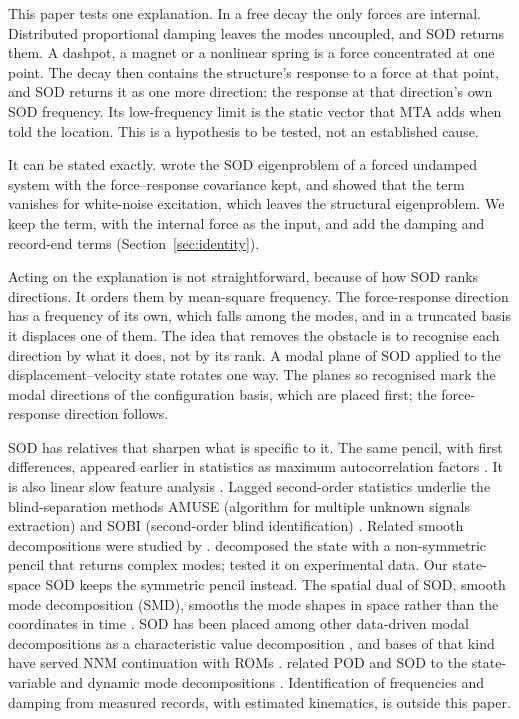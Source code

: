 \documentclass[preprint,12pt]{elsarticle}
\begin{document}
This paper tests one explanation. In a free decay the only forces are internal. Distributed proportional damping leaves the modes uncoupled, and SOD returns them. A dashpot, a magnet or a nonlinear spring is a force concentrated at one point. The decay then contains the structure's response to a force at that point, and SOD returns it as one more direction: the response at that direction's own SOD frequency. Its low-frequency limit is the static vector that MTA adds when told the location. This is a hypothesis to be tested, not an established cause.

It can be stated exactly. \citet{Farooq2008} wrote the SOD eigenproblem of a forced undamped system with the force--response covariance kept, and showed that the term vanishes for white-noise excitation, which leaves the structural eigenproblem. We keep the term, with the internal force as the input, and add the damping and record-end terms (Section~\ref{sec:identity}).

Acting on the explanation is not straightforward, because of how SOD ranks directions. It orders them by mean-square frequency. The force-response direction has a frequency of its own, which falls among the modes, and in a truncated basis it displaces one of them.
The idea that removes the obstacle is to recognise each direction by what it does, not by its rank. A modal plane of SOD applied to the displacement--velocity state rotates one way. The planes so recognised mark the modal directions of the configuration basis, which are placed first; the force-response direction follows.


SOD has relatives that sharpen what is specific to it.
The same pencil, with first differences, appeared earlier in statistics as maximum autocorrelation factors \citep{Switzer1984,Shapiro1989}. It is also linear slow feature analysis \citep{Wiskott2002}. Lagged second-order statistics underlie the blind-separation methods AMUSE (algorithm for multiple unknown signals extraction) and SOBI (second-order blind identification) \citep{Tong1991,Belouchrani1997}. Related smooth decompositions were studied by \citet{Bellizzi2009,Bellizzi2012}.
\citet{Feeny2008} decomposed the state with a non-symmetric pencil that returns complex modes; \citet{Farooq2012} tested it on experimental data. Our state-space SOD keeps the symmetric pencil instead.
The spatial dual of SOD, smooth mode decomposition (SMD), smooths the mode shapes in space rather than the coordinates in time \citep{Li2023}. SOD has been placed among other data-driven modal decompositions as a characteristic value decomposition \citep{Li2025}, and bases of that kind have served NNM continuation with ROMs \citep{Stein2025}. \citet{Khan2020} related POD and SOD to the state-variable and dynamic mode decompositions \citep{Schmid2010}.
Identification of frequencies and damping from measured records, with estimated kinematics, is outside this paper.
\end{document}
